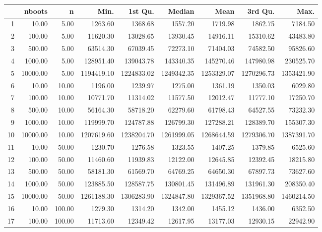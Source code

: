 \begin{table}[ht]
\centering
\begin{tabular}{rrrrrrrrr}
  \hline
 & nboots & n & Min. & 1st Qu. & Median & Mean & 3rd Qu. & Max. \\ 
  \hline
1 & 10.00 & 5.00 & 1263.60 & 1368.68 & 1557.20 & 1719.98 & 1862.75 & 7184.50 \\ 
  2 & 100.00 & 5.00 & 11620.30 & 13028.65 & 13930.45 & 14916.11 & 15310.62 & 43483.80 \\ 
  3 & 500.00 & 5.00 & 63514.30 & 67039.45 & 72273.10 & 71404.03 & 74582.50 & 95826.60 \\ 
  4 & 1000.00 & 5.00 & 128951.40 & 139043.78 & 143340.35 & 145270.46 & 147980.98 & 230525.70 \\ 
  5 & 10000.00 & 5.00 & 1194419.10 & 1224833.02 & 1249342.35 & 1253329.07 & 1270296.73 & 1353421.90 \\ 
  6 & 10.00 & 10.00 & 1196.00 & 1239.97 & 1275.00 & 1361.19 & 1350.03 & 6029.80 \\ 
  7 & 100.00 & 10.00 & 10771.70 & 11314.02 & 11577.50 & 12012.47 & 11777.10 & 17250.70 \\ 
  8 & 500.00 & 10.00 & 56164.30 & 58718.20 & 62279.60 & 61798.43 & 64527.55 & 73232.30 \\ 
  9 & 1000.00 & 10.00 & 119999.70 & 124787.88 & 126799.30 & 127288.21 & 128389.70 & 155307.30 \\ 
  10 & 10000.00 & 10.00 & 1207619.60 & 1238204.70 & 1261999.05 & 1268644.59 & 1279306.70 & 1387391.70 \\ 
  11 & 10.00 & 50.00 & 1230.70 & 1276.58 & 1323.55 & 1407.25 & 1379.85 & 6525.60 \\ 
  12 & 100.00 & 50.00 & 11460.60 & 11939.83 & 12122.00 & 12645.85 & 12392.45 & 18215.80 \\ 
  13 & 500.00 & 50.00 & 58181.30 & 61569.70 & 64769.25 & 64650.30 & 67897.73 & 73627.60 \\ 
  14 & 1000.00 & 50.00 & 123885.50 & 128587.75 & 130801.45 & 131496.89 & 131961.30 & 208350.40 \\ 
  15 & 10000.00 & 50.00 & 1261188.30 & 1306283.90 & 1324847.80 & 1329367.52 & 1351968.80 & 1460214.50 \\ 
  16 & 10.00 & 100.00 & 1279.30 & 1314.20 & 1342.00 & 1455.12 & 1436.00 & 6352.50 \\ 
  17 & 100.00 & 100.00 & 11713.60 & 12349.42 & 12617.95 & 13177.03 & 12930.15 & 22942.90 \\ 

\end{tabular}
\end{table}
